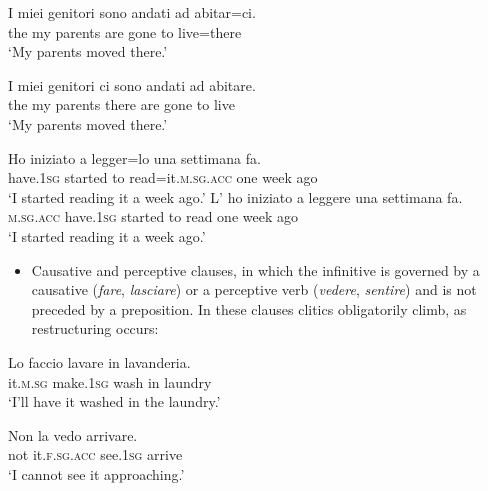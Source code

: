 \documentclass[output=paper,modfonts,nonflat,newtxmath]{langsci/langscibook}
\begin{document}
\ea \label{ex:sciutti:6}
    \begin{xlist}
    \ex \label{ex:sciutti:6a}
    \gll I miei genitori sono andati ad abitar=ci.\\
         the my parents are gone to live=there\\
    \glt  ‘My parents moved there.’

    \ex \label{ex:sciutti:6b}
    \gll I miei genitori ci sono andati ad abitare.\\
         the my  parents there are  gone  to live\\
    \glt  ‘My parents moved there.’
    \end{xlist}
\z

\ea \label{ex:sciutti:7}
    \begin{xlist}
    \ex \label{ex:sciutti:7a}
    \gll Ho iniziato a legger=lo una settimana fa.\\
         have.\textsc{1sg} started to read=it.\textsc{m.sg.acc} one  week  ago\\
    \glt  ‘I started reading it a week ago.’
    \ex \label{ex:sciutti:7b}
    \gll L’ ho iniziato a leggere una settimana     fa.\\
         \textsc{m.sg.acc} have.\textsc{1sg} started to read one week ago\\
    \glt  ‘I started reading it a week ago.’
    \end{xlist}
\z


\begin{itemize}
\item Causative and perceptive clauses, in which the infinitive is governed by a causative (\textit{fare}, \textit{lasciare}) or a perceptive verb (\textit{vedere}, \textit{sentire}) and is not preceded by a preposition. In these clauses clitics obligatorily climb, as restructuring occurs:
\end{itemize}

\ea \label{ex:sciutti:8}
    \gll Lo faccio lavare in lavanderia.\\
        it.\textsc{m.sg}   make.\textsc{1sg} wash in laundry\\
    \glt  ‘I’ll have it washed in the laundry.’
\z



\ea \label{ex:sciutti:9}
    \gll Non la vedo arrivare.\\
       not it.\textsc{f.sg.acc}   see.\textsc{1sg} arrive\\
    \glt  ‘I cannot see it approaching.’
\z
\end{document}
